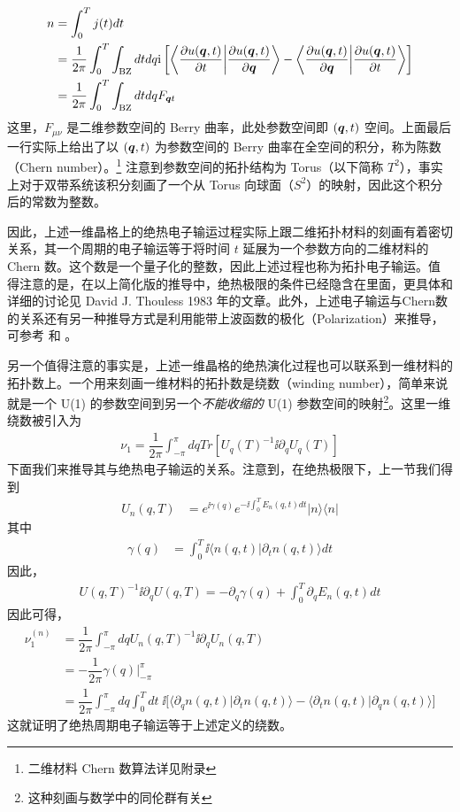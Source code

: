 \begin{align}
n &= \int_0^Tj(t)dt \\
& = \frac{1}{2\pi}\int_0^T\int_{\text{BZ}}dtdq \mathrm{i}\left[\left\langle\dfrac{\partial u(\boldsymbol{q},t)}{\partial t}\bigg|\dfrac{\partial u(\boldsymbol{q},t)}{\partial\boldsymbol{q}}\right\rangle - \left\langle\dfrac{\partial u(\boldsymbol{q},t)}{\partial\boldsymbol{q}}\bigg|\dfrac{\partial u(\boldsymbol{q},t)}{\partial t}\right\rangle\right] \\ 
& = \frac{1}{2\pi}\int_0^T\int_{\text{BZ}}dtdq F_{\boldsymbol{q}t}\label{Chern}
\end{align}
这里，$F_{\mu\nu}$ 是二维参数空间的 Berry 曲率，此处参数空间即 $(\boldsymbol{q}, t)$ 空间。上面最后一行实际上给出了以 $(\boldsymbol{q}, t)$ 为参数空间的 Berry 曲率在全空间的积分，称为陈数（Chern number）。\footnote{二维材料 Chern 数算法详见附录} 注意到参数空间的拓扑结构为 Torus（以下简称 $T^2$），事实上对于双带系统该积分刻画了一个从 Torus 向球面（$S^2$）的映射，因此这个积分后的常数为整数。


因此，上述一维晶格上的绝热电子输运过程实际上跟二维拓扑材料的刻画有着密切关系，其一个周期的电子输运等于将时间 $t$ 延展为一个参数方向的二维材料的 Chern 数。这个数是一个量子化的整数，因此上述过程也称为拓扑电子输运。值得注意的是，在以上简化版的推导中，绝热极限的条件已经隐含在里面，更具体和详细的讨论见 David J. Thouless 1983 年的文章。此外，上述电子输运与Chern数的关系还有另一种推导方式是利用能带上波函数的极化（Polarization）来推导，可参考 和 。

另一个值得注意的事实是，上述一维晶格的绝热演化过程也可以联系到一维材料的拓扑数上。一个用来刻画一维材料的拓扑数是绕数（winding number），简单来说就是一个 U(1) 的参数空间到另一个\textit{不能收缩的} U(1) 参数空间的映射\footnote{这种刻画与数学中的同伦群有关}。这里一维绕数被引入为\cite{kitagawa2010}
\begin{align}
\nu_1=\dfrac{1}{2\pi}\int_{-\pi}^{\pi}dq Tr[U_q(T)^{-1}\ii\partial_qU_q(T)]\label{wind}
\end{align}
下面我们来推导其与绝热电子输运的关系。注意到，在绝热极限下，上一节我们得到
\begin{align}
U_n(q,T) &= e^{\ii\gamma(q)}e^{-\ii\int_0^TE_n(q,t)dt}|n\rangle\langle n|
\end{align}
其中
\begin{align}
\gamma(q) &=\int_0^T\ii\langle n(q,t)|\partial_tn(q,t)\rangle dt
\end{align}
因此，
\begin{align}
U(q,T)^{-1}\ii\partial_qU(q,T)=-\partial_q\gamma(q)+\int_0^T\partial_qE_n(q,t)dt
\end{align}
因此可得，
\begin{align}
\nu_1^{(n)}&= \dfrac{1}{2\pi}\int_{-\pi}^{\pi}dq U_n(q,T)^{-1}\ii\partial_qU_n(q,T)\\
&= -\dfrac{1}{2\pi}\gamma(q)\bigg|_{-\pi}^{\pi}\\
&= \dfrac{1}{2\pi}\int_{-\pi}^{\pi}dq\int_0^Tdt\;\ii\bigg[\langle\partial_qn(q,t)|\partial_tn(q,t)\rangle-\langle\partial_tn(q,t)|\partial_qn(q,t)\rangle\bigg]
\end{align}
这就证明了绝热周期电子输运等于上述定义的绕数。

